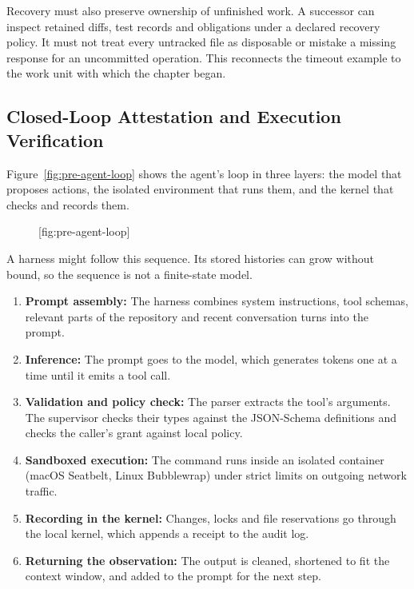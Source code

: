 Recovery must also preserve ownership of unfinished work. A successor can
inspect retained diffs, test records and obligations under a declared recovery
policy. It must not treat every untracked file as disposable or mistake a
missing response for an uncommitted operation. This reconnects the timeout
example to the work unit with which the chapter began.


\subsection{Closed-Loop Attestation and Execution Verification}

Figure~\ref{fig:pre-agent-loop} shows the agent's loop in three layers: the model that proposes actions, the isolated environment that runs them, and the kernel that checks and records them.

\begin{figure}[tp]
  \centering
  [fig:pre-agent-loop]
\end{figure}



A harness might follow this sequence. Its stored histories can grow without bound, so the sequence is not a finite-state model.
\begin{enumerate}[leftmargin=1.8em,itemsep=2pt]
  \item \textbf{Prompt assembly:} The harness combines system instructions, tool schemas, relevant parts of the repository and recent conversation turns into the prompt.
  \item \textbf{Inference:} The prompt goes to the model, which generates tokens one at a time until it emits a tool call.
  \item \textbf{Validation and policy check:} The parser extracts the tool's arguments. The supervisor checks their types against the JSON-Schema definitions and checks the caller's grant against local policy.
  \item \textbf{Sandboxed execution:} The command runs inside an isolated container (macOS Seatbelt, Linux Bubblewrap) under strict limits on outgoing network traffic.
  \item \textbf{Recording in the kernel:} Changes, locks and file reservations go through the local kernel, which appends a receipt to the audit log.
  \item \textbf{Returning the observation:} The output is cleaned, shortened to fit the context window, and added to the prompt for the next step.
\end{enumerate}


